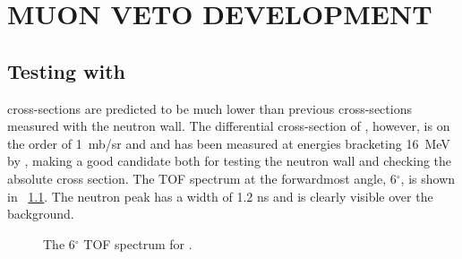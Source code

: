 %
%
%
%
%
%
%
%

%
%

\chapter{MUON VETO DEVELOPMENT}
\label{chap:muVeto}

\section{Testing with \MgReaction}

\GeTargets cross-sections are predicted to be much lower than previous cross-sections measured with the neutron wall.  The differential cross-section of \MgReaction, however, is on the order of 1~mb/sr and and has been measured at energies bracketing 16~MeV by \cite{Bohne_Mg}, making  a good candidate both for testing the neutron wall and checking the \reaction absolute cross section.  The TOF spectrum at the forwardmost angle, 6$^{\circ}$, is shown in {\fig}~\ref{fig:MgTOF}.  The neutron peak has a width of 1.2 ns and is clearly visible over the background. 
\begin{figure}[htp]
\vspace{3in}
\caption{The 6$^{\circ}$ TOF spectrum for \MgReaction.}
\label{fig:MgTOF}
\end{figure}

